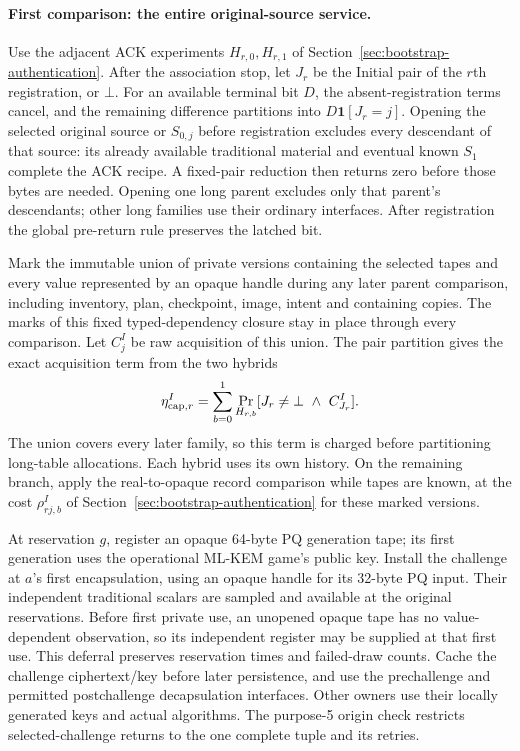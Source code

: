 \paragraph{First comparison: the entire original-source service.}
Use the adjacent ACK experiments $H_{r,0},H_{r,1}$ of
Section~\ref{sec:bootstrap-authentication}. After the association stop,
let $J_r$ be the Initial pair of the $r$th registration, or $\bot$.
For an available terminal bit $D$, the absent-registration terms cancel,
and the remaining difference partitions into
$D\mathbf1[J_r=j]$. Opening the selected original source or $S_{0,j}$
before registration excludes every descendant of that source: its
already available traditional material and eventual known $S_1$ complete
the ACK recipe. A fixed-pair reduction then returns zero before those
bytes are needed. Opening one long parent excludes only that parent's
descendants; other long families use their ordinary interfaces.
After registration the global pre-return rule preserves the latched bit.

Mark the immutable union of private versions containing the selected
tapes and every value represented by an opaque handle during any later
parent comparison, including inventory, plan, checkpoint, image, intent
and containing copies. The marks of this fixed typed-dependency closure
stay in place through every comparison. Let $C_j^I$ be raw acquisition of this union.
The pair partition gives the exact acquisition term from the two hybrids
\begin{equation}
 \eta^I_{{\rm cap},r}
   =\sum_{b=0}^{1}\Pr_{H_{r,b}}
          [J_r\ne\bot\ \land\ C^I_{J_r}].
 \label{eq:bootstrap-initial-capture}
\end{equation}
The union covers every later family, so this term is charged before
partitioning long-table allocations. Each hybrid uses its own history.
On the remaining branch, apply the real-to-opaque record comparison
while tapes are known, at the cost $\rho^I_{rj,b}$ of
Section~\ref{sec:bootstrap-authentication} for these marked versions.

At reservation $g$, register an opaque 64-byte PQ generation tape; its
first generation uses the operational ML-KEM game's public key. Install
the challenge at $a$'s first encapsulation, using an opaque handle for
its 32-byte PQ input. Their independent traditional scalars are sampled
and available at the original reservations.
Before first private use, an unopened opaque tape has no value-dependent
observation, so its independent register may be supplied at that first use.
This deferral preserves reservation times and failed-draw counts. Cache
the challenge ciphertext/key before later persistence, and use the
prechallenge and permitted postchallenge decapsulation interfaces. Other
owners use their locally generated keys and actual algorithms.
The purpose-5 origin check restricts selected-challenge returns to the
one complete tuple and its retries.

